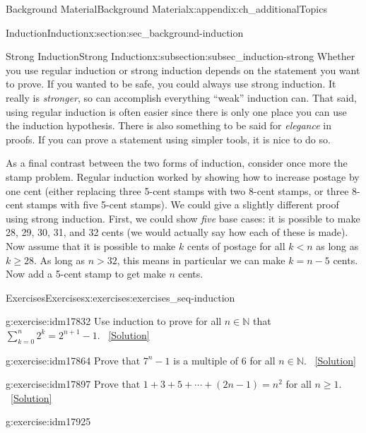 \documentclass[oneside,10pt,]{book}
\numberwithin{equation}{chapter}
\def\d{\displaystyle}
\def\N{\mathbb N}
\newcommand{\lt}{<}
\begin{document}
\begin{appendixptx}{Background Material}{}{Background Material}{}{}{x:appendix:ch_additionalTopics}
\begin{sectionptx}{Induction}{}{Induction}{}{}{x:section:sec_background-induction}
\begin{subsectionptx}{Strong Induction}{}{Strong Induction}{}{}{x:subsection:subsec_induction-strong}
Whether you use regular induction or strong induction depends on the statement you want to prove. If you wanted to be safe, you could always use strong induction. It really is \emph{stronger}, so can accomplish everything ``weak'' induction can. That said, using regular induction is often easier since there is only one place you can use the induction hypothesis. There is also something to be said for \emph{elegance} in proofs. If you can prove a statement using simpler tools, it is nice to do so.%
\par
As a final contrast between the two forms of induction, consider once more the stamp problem. Regular induction worked by showing how to increase postage by one cent (either replacing three 5-cent stamps with two 8-cent stamps, or three 8-cent stamps with five 5-cent stamps). We could give a slightly different proof using strong induction. First, we could show \emph{five} base cases: it is possible to make 28, 29, 30, 31, and 32 cents (we would actually say how each of these is made). Now assume that it is possible to make \(k\) cents of postage for all \(k \lt  n\) as long as \(k \ge 28\). As long as \(n > 32\), this means in particular we can make \(k = n-5\) cents. Now add a 5-cent stamp to get make \(n\) cents.%
\end{subsectionptx}
%
%
\typeout{************************************************}
\typeout{************************************************}
%
\begin{exercises-subsection}{Exercises}{}{Exercises}{}{}{x:exercises:exercises_seq-induction}
\begin{divisionexercise}{1}{}{}{g:exercise:idm17832}%
Use induction to prove for all \(n \in \N\) that \(\d\sum_{k=0}^n 2^k = 2^{n+1} - 1\).%
\qquad~\hfill{\tiny\hyperlink{g:solution:idm17837-main}{[Solution]}}\end{divisionexercise}%
\begin{divisionexercise}{2}{}{}{g:exercise:idm17864}%
Prove that \(7^n - 1\) is a multiple of 6 for all \(n \in \N\).%
\qquad~\hfill{\tiny\hyperlink{g:solution:idm17869-main}{[Solution]}}\end{divisionexercise}%
\begin{divisionexercise}{3}{}{}{g:exercise:idm17897}%
Prove that \(1 + 3 + 5 + \cdots + (2n-1) = n^2\) for all \(n \ge 1\).%
\qquad~\hfill{\tiny\hyperlink{g:solution:idm17902-main}{[Solution]}}\end{divisionexercise}%
\begin{divisionexercise}{4}{}{}{g:exercise:idm17925}%

\end{divisionexercise}
\end{exercises-subsection}
\end{sectionptx}
\end{appendixptx}
\end{document}
